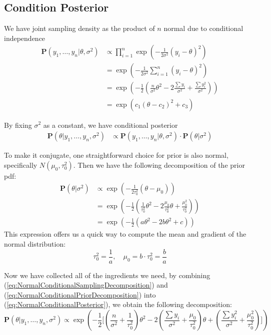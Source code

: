 \subsection{Condition Posterior}
We have joint sampling density as the product of $n$ normal due to conditional independence
\begin{align}
    \mathbf{P}(y_1, \ldots, y_n | \theta, \sigma^2) &\propto \prod_{i=1}^{n}\exp(-\frac{1}{2\sigma^2}(y_i - \theta)^2) \\
    &=\exp(-\frac{1}{2\sigma^2}\sum_{i=1}^{n}(y_i - \theta)^2) \\
    &=\exp(-\frac{1}{2}(\frac{n}{\sigma^2}\theta^2 - 2\frac{\sum y_i}{\sigma^2} + \frac{\sum y_i^2}{\sigma^2})) \label{eq:NormalConditionalSamplingDecomposition}\\
    &=\exp(c_1(\theta - c_2)^2 + c_3)
\end{align}

By fixing $\sigma^2$ as a constant, we have conditional posterior
\begin{align}
    \mathbf{P}(\theta | y_1, \ldots, y_n, \sigma^2) &\propto \mathbf{P}(y_1, \ldots, y_n | \theta, \sigma^2) \cdot \mathbf{P}(\theta | \sigma^2)  \label{eq:NormalConditionalPosterior}
\end{align}

To make it conjugate, one straightforward choice for prior is also normal, specifically $N(\mu_0, \tau_0^2)$. Then we have the following decomposition of the prior pdf:
\begin{align}
    \mathbf{P}(\theta | \sigma^2) &\propto \exp(- \frac{1}{2\tau_0^2}(\theta - \mu_0)) \\
    &=\exp(-\frac{1}{2}(\frac{1}{\tau_0^2}\theta^2 - 2\frac{\mu_0}{\tau_0^2}\theta + \frac{\mu_0^2}{\tau_0^2})) \label{eq:NormalConditionalPriorDecomposition}\\
    &=\exp(-\frac{1}{2}(a\theta^2 - 2b\theta^2 +c))
\end{align}
This expression offers us a quick way to compute the mean and gradient of the normal distribution:
\begin{equation}
    \tau_0^2 = \frac{1}{a}, \quad \mu_0 = b \cdot \tau_0^2 = \frac{b}{a} \label{eq:QuickNormalMeanVarFormula}
\end{equation}

Now we have collected all of the ingredients we need, by combining (\ref{eq:NormalConditionalSamplingDecomposition}) and (\ref{eq:NormalConditionalPriorDecomposition}) into (\ref{eq:NormalConditionalPosterior}), we obtain the following decomposition:
\begin{equation}
    \mathbf{P}(\theta | y_1, \ldots, y_n, \sigma^2) \propto \exp(-\frac{1}{2}\big[ (\frac{n}{\sigma^2} + \frac{1}{\tau_0^2})\theta^2 - 2(\frac{\sum y_i}{\sigma^2} + \frac{\mu_0}{\tau_0^2})\theta + (\frac{\sum y_i^2}{\sigma^2} + \frac{\mu_0^2}{\tau_0^2}) \big])
\end{equation}

